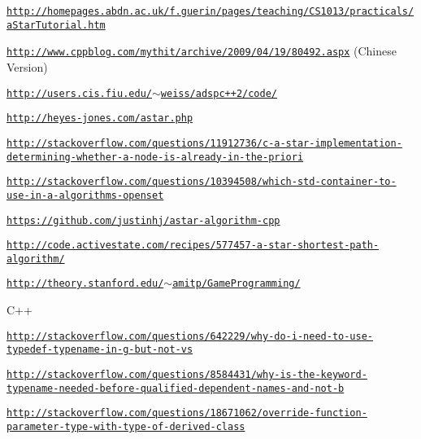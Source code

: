 \begin{DoxyItemize}
\item \href{http://homepages.abdn.ac.uk/f.guerin/pages/teaching/CS1013/practicals/aStarTutorial.htm}{\tt http\-://homepages.\-abdn.\-ac.\-uk/f.\-guerin/pages/teaching/\-C\-S1013/practicals/a\-Star\-Tutorial.\-htm}
\item \href{http://www.cppblog.com/mythit/archive/2009/04/19/80492.aspx}{\tt http\-://www.\-cppblog.\-com/mythit/archive/2009/04/19/80492.\-aspx} (Chinese Version)
\item \href{http://users.cis.fiu.edu/~weiss/adspc++2/code/}{\tt http\-://users.\-cis.\-fiu.\-edu/$\sim$weiss/adspc++2/code/}
\item \href{http://heyes-jones.com/astar.php}{\tt http\-://heyes-\/jones.\-com/astar.\-php}
\item \href{http://stackoverflow.com/questions/11912736/c-a-star-implementation-determining-whether-a-node-is-already-in-the-priori}{\tt http\-://stackoverflow.\-com/questions/11912736/c-\/a-\/star-\/implementation-\/determining-\/whether-\/a-\/node-\/is-\/already-\/in-\/the-\/priori}
\item \href{http://stackoverflow.com/questions/10394508/which-std-container-to-use-in-a-algorithms-openset}{\tt http\-://stackoverflow.\-com/questions/10394508/which-\/std-\/container-\/to-\/use-\/in-\/a-\/algorithms-\/openset}
\item \href{https://github.com/justinhj/astar-algorithm-cpp}{\tt https\-://github.\-com/justinhj/astar-\/algorithm-\/cpp}
\item \href{http://code.activestate.com/recipes/577457-a-star-shortest-path-algorithm/}{\tt http\-://code.\-activestate.\-com/recipes/577457-\/a-\/star-\/shortest-\/path-\/algorithm/}
\item \href{http://theory.stanford.edu/~amitp/GameProgramming/}{\tt http\-://theory.\-stanford.\-edu/$\sim$amitp/\-Game\-Programming/}
\end{DoxyItemize}

C++


\begin{DoxyItemize}
\item \href{http://stackoverflow.com/questions/642229/why-do-i-need-to-use-typedef-typename-in-g-but-not-vs}{\tt http\-://stackoverflow.\-com/questions/642229/why-\/do-\/i-\/need-\/to-\/use-\/typedef-\/typename-\/in-\/g-\/but-\/not-\/vs}
\item \href{http://stackoverflow.com/questions/8584431/why-is-the-keyword-typename-needed-before-qualified-dependent-names-and-not-b}{\tt http\-://stackoverflow.\-com/questions/8584431/why-\/is-\/the-\/keyword-\/typename-\/needed-\/before-\/qualified-\/dependent-\/names-\/and-\/not-\/b}
\item \href{http://stackoverflow.com/questions/18671062/override-function-parameter-type-with-type-of-derived-class}{\tt http\-://stackoverflow.\-com/questions/18671062/override-\/function-\/parameter-\/type-\/with-\/type-\/of-\/derived-\/class} 
\end{DoxyItemize}
